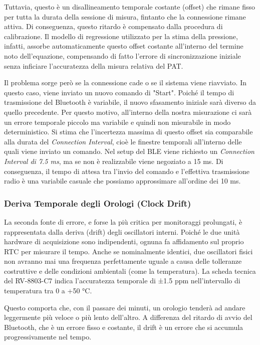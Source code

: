 \documentclass[11pt,a4paper]{article}
\begin{document}
Tuttavia, questo è un disallineamento temporale costante (offset) che rimane fisso per tutta la durata della sessione di misura, fintanto che la connessione rimane attiva. Di conseguenza, questo ritardo è compensato dalla procedura di calibrazione. Il modello di regressione utilizzato per la stima della pressione, infatti, assorbe automaticamente questo offset costante all'interno del termine noto dell'equazione, compensando di fatto l'errore di sincronizzazione iniziale senza inficiare l'accuratezza della misura relativa del PAT.

Il problema sorge però se la connessione cade o se il sistema viene riavviato. In questo caso, viene inviato un nuovo comando di "Start". Poiché il tempo di trasmissione del Bluetooth è variabile, il nuovo sfasamento iniziale sarà diverso da quello precedente. Per questo motivo, all’interno della nostra misurazione ci sarà un errore temporale piccolo ma variabile e quindi non misurabile in modo deterministico. Si stima che l'incertezza massima di questo offset sia comparabile alla durata del \textit{Connection Interval}, cioè le finestre temporali all'interno delle quali viene inviato un comando. Nel setup del BLE viene richiesto un \textit{Connection Interval di 7.5 ms}, ma se non è realizzabile viene negoziato a 15 ms. Di conseguenza, il tempo di attesa tra l'invio del comando e l'effettiva trasmissione radio è una variabile casuale che possiamo approssimare all'ordine dei 10 ms.

\subsubsection{Deriva Temporale degli Orologi (Clock Drift)}
La seconda fonte di errore, e forse la più critica per monitoraggi prolungati, è rappresentata dalla deriva (drift) degli oscillatori interni. Poiché le due unità hardware di acquisizione sono indipendenti, ognuna fa affidamento sul proprio RTC per misurare il tempo. Anche se nominalmente identici, due oscillatori fisici non avranno mai una frequenza perfettamente uguale a causa delle tolleranze costruttive e delle condizioni ambientali (come la temperatura). La scheda tecnica del RV-8803-C7 indica l’accuratezza temporale di ±1.5 ppm nell’intervallo di temperatura tra 0 a +50 °C.

Questo comporta che, con il passare dei minuti, un orologio tenderà ad andare leggermente più veloce o più lento dell'altro. A differenza del ritardo di avvio del Bluetooth, che è un errore fisso e costante, il drift è un errore che si accumula progressivamente nel tempo.
\end{document}
